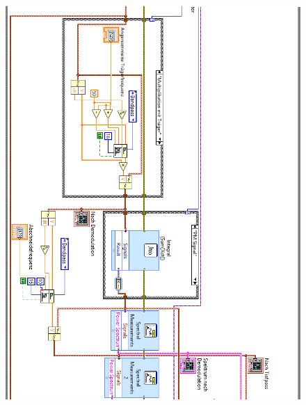 	\begin{figure}[H]
		\centering
		\includegraphics[width=\textwidth]{pic/messstruktur_dafpm2.png}
	\end{figure} 
